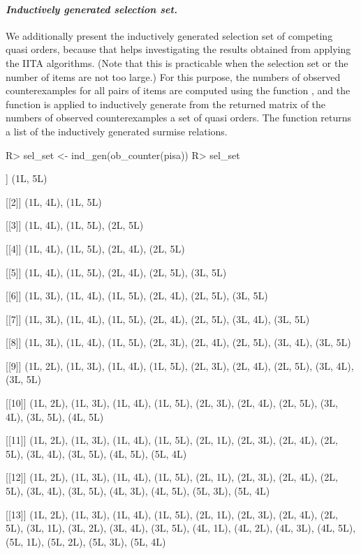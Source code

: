 \documentclass[nojss]{jss}
\begin{document}
\paragraph{\it Inductively generated selection set.}
We additionally present the inductively generated selection set of competing quasi orders, 
because that helps investigating the results obtained from applying the IITA algorithms.
(Note that this is practicable when the selection set or the number of items are not too large.)
For this purpose, the numbers of observed counterexamples for all pairs of items 
are computed using the function , and the function  
is applied to inductively generate from the returned matrix of the numbers of observed 
counterexamples a set of quasi orders. The function  returns a list of the 
inductively generated surmise relations.
\begin{Schunk}
\begin{Sinput}
R> sel_set <- ind_gen(ob_counter(pisa))
R> sel_set
\end{Sinput}
\begin{Soutput}
[[1]]
{(1L, 5L)}

[[2]]
{(1L, 4L), (1L, 5L)}

[[3]]
{(1L, 4L), (1L, 5L), (2L, 5L)}

[[4]]
{(1L, 4L), (1L, 5L), (2L, 4L), (2L, 5L)}

[[5]]
{(1L, 4L), (1L, 5L), (2L, 4L), (2L, 5L), (3L, 5L)}

[[6]]
{(1L, 3L), (1L, 4L), (1L, 5L), (2L, 4L), (2L, 5L), (3L, 5L)}

[[7]]
{(1L, 3L), (1L, 4L), (1L, 5L), (2L, 4L), (2L, 5L), (3L, 4L),
 (3L, 5L)}

[[8]]
{(1L, 3L), (1L, 4L), (1L, 5L), (2L, 3L), (2L, 4L), (2L, 5L),
 (3L, 4L), (3L, 5L)}

[[9]]
{(1L, 2L), (1L, 3L), (1L, 4L), (1L, 5L), (2L, 3L), (2L, 4L),
 (2L, 5L), (3L, 4L), (3L, 5L)}

[[10]]
{(1L, 2L), (1L, 3L), (1L, 4L), (1L, 5L), (2L, 3L), (2L, 4L),
 (2L, 5L), (3L, 4L), (3L, 5L), (4L, 5L)}

[[11]]
{(1L, 2L), (1L, 3L), (1L, 4L), (1L, 5L), (2L, 1L), (2L, 3L),
 (2L, 4L), (2L, 5L), (3L, 4L), (3L, 5L), (4L, 5L), (5L, 4L)}

[[12]]
{(1L, 2L), (1L, 3L), (1L, 4L), (1L, 5L), (2L, 1L), (2L, 3L),
 (2L, 4L), (2L, 5L), (3L, 4L), (3L, 5L), (4L, 3L), (4L, 5L),
 (5L, 3L), (5L, 4L)}

[[13]]
{(1L, 2L), (1L, 3L), (1L, 4L), (1L, 5L), (2L, 1L), (2L, 3L),
 (2L, 4L), (2L, 5L), (3L, 1L), (3L, 2L), (3L, 4L), (3L, 5L),
 (4L, 1L), (4L, 2L), (4L, 3L), (4L, 5L), (5L, 1L), (5L, 2L),
 (5L, 3L), (5L, 4L)}
\end{Soutput}
\end{Schunk}
\end{document}
